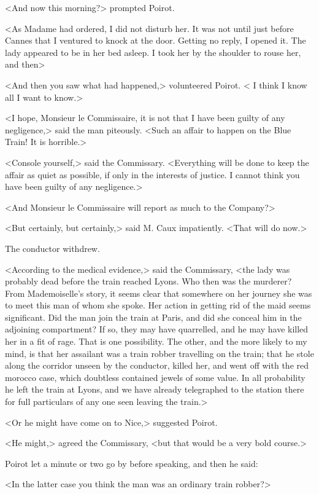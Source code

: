 <And now this morning?> prompted Poirot.

<As Madame had ordered, I did not disturb her. It was not until just before Cannes that I ventured to knock at the door. Getting no reply, I opened it. The lady appeared to be in her bed asleep. I took her by the shoulder to rouse her, and then\longdash>

<And then you saw what had happened,> volunteered Poirot. < I think I know all I want to know.>

<I hope, Monsieur le Commissaire, it is not that I have been guilty of any negligence,> said the man piteously. <Such an affair to happen on the Blue Train! It is horrible.>

<Console yourself,> said the Commissary. <Everything will be done to keep the affair as quiet as possible, if only in the interests of justice. I cannot think you have been guilty of any negligence.>

<And Monsieur le Commissaire will report as much to the Company?>

<But certainly, but certainly,> said M. Caux impatiently. <That will do now.>

The conductor withdrew.

<According to the medical evidence,> said the Commissary, <the lady was probably dead before the train reached Lyons. Who then was the murderer? From Mademoiselle's story, it seems clear that somewhere on her journey she was to meet this man of whom she spoke. Her action in getting rid of the maid seems significant. Did the man join the train at Paris, and did she conceal him in the adjoining compartment? If so, they may have quarrelled, and he may have killed her in a fit of rage. That is one possibility. The other, and the more likely to my mind, is that her assailant was a train robber travelling on the train; that he stole along the corridor unseen by the conductor, killed her, and went off with the red morocco case, which doubtless contained jewels of some value. In all probability he left the train at Lyons, and we have already telegraphed to the station there for full particulars of any one seen leaving the train.>

<Or he might have come on to Nice,> suggested Poirot.

<He might,> agreed the Commissary, <but that would be a very bold course.>

Poirot let a minute or two go by before speaking, and then he said:

<In the latter case you think the man was an ordinary train robber?>

